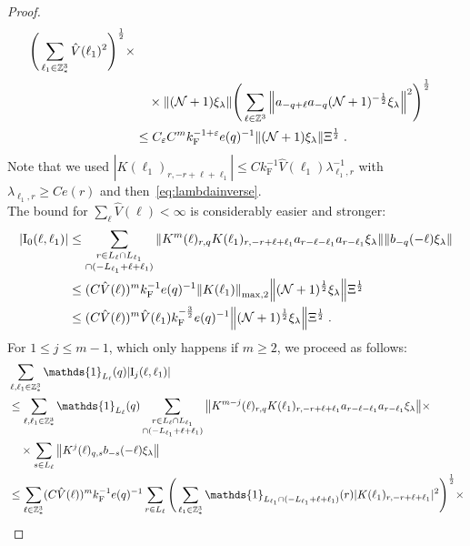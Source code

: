 \documentclass[12pt,a4paper]{article}
\numberwithin{equation}{section}
\newcommand{\1}{\mathbb{I}}
\newcommand{\F}{\mathrm{F}}
\newcommand{\I}{\mathrm{I}}
\newcommand{\Z}{\mathbb{Z}}
\newcommand{\NN}{\mathcal{N}}
\newcommand{\half}{\frac{1}{2}}
\theoremstyle{plain}
\theoremstyle{definition}
\theoremstyle{remark}
\theoremstyle{plain}
\theoremstyle{definition}
\theoremstyle{remark}
\begin{document}
\begin{proof}
\begin{align}
		\Bigg( \sum_{\ell_1 \in \Z^3_*} \hat{V}(\ell_1)^2 \Bigg)^{\half} \times \nonumber\\
	&\quad \times \norm{(\NN+1) \xi_\lambda}
		\Bigg( \sum_{\ell \in \Z^3} \norm{a_{-q+\ell} a_{-q} (\NN+1)^{-\half} \xi_\lambda}^2 \Bigg)^{\half} \nonumber\\
	&\leq C_\varepsilon C^m k_{\F}^{-1 + \varepsilon} e(q)^{-1}
		\norm{ (\NN+1) \xi_\lambda } \Xi^{\half} \;. \label{eq:estEQ2151_Coulomb}
\end{align}
Note that we used $ |K(\ell_1)_{r,-r+\ell+\ell_1}| \le C k_{\F}^{-1} \hat{V}(\ell_1) \lambda_{\ell_1,r}^{-1} $ with $ \lambda_{\ell_1,r} \ge C e(r) $ and then~\eqref{eq:lambdainverse}.\\
The bound for $ \sum_{\ell} \hat{V}(\ell) < \infty $ is considerably easier and stronger:
\begin{align}
	|\I_0(\ell, \ell_1)|
	&\leq \sum_{\substack{r\in L_{\ell} \cap L_{\ell_1} \\ \cap (-L_{\ell_1}+\ell+\ell_1)}} \norm{K^m(\ell)_{r,q} K(\ell_1)_{r,-r+\ell+\ell_1} a_{r-\ell-\ell_1} a_{r-\ell_1} \xi_\lambda}\norm{ b_{-q}(-\ell) \xi_\lambda}\nonumber\\
	&\leq (C \hat{V}(\ell))^m k_{\F}^{-1} e(q)^{-1}
		\norm{K(\ell_1)}_{\max,2} \norm{ (\NN+1)^\half \xi_\lambda } \Xi^{\half} \nonumber\\
	&\leq (C \hat{V}(\ell))^m
		\hat{V}(\ell_1)
		k_{\F}^{-\frac 32} e(q)^{-1}
		\norm{ (\NN+1)^\half \xi_\lambda } \Xi^{\half} \;. \label{eq:estEQ2151}
\end{align}
For $ 1 \le j \le m-1 $, which only happens if $ m \ge 2 $, we proceed as follows:
\begin{align}
	&\sum_{\ell,\ell_1 \in \Z^3_*} \mathds{1}_{L_\ell}(q) |\I_j(\ell, \ell_1)| \nonumber\\
	&\leq \sum_{\ell,\ell_1 \in \Z^3_*} \mathds{1}_{L_\ell}(q) \sum\limits_{\substack{r\in L_{\ell} \cap L_{\ell_1}\\ \cap (-L_{\ell_1}+\ell+\ell_1)}}
		\norm{ K^{m-j}(\ell)_{r,q} K(\ell_1)_{r,-r+\ell+\ell_1} a_{r-\ell-\ell_1} a_{r-\ell_1} \xi_\lambda} \times \nonumber\\
	&\quad \times \sum\limits_{s \in L_{\ell}}
		\norm{ K^j(\ell)_{q,s} b_{-s}(-\ell) \xi_\lambda }\nonumber\\
	&\leq \sum_{\ell \in \Z^3_*} (C \hat{V}(\ell))^m k_{\F}^{-1} e(q)^{-1}
		\sum_{r \in L_\ell}
		\Bigg( \sum_{\ell_1 \in \Z^3_*} \mathds{1}_{L_{\ell_1} \cap (-L_{\ell_1}+\ell+\ell_1) }(r) |K(\ell_1)_{r,-r+\ell+\ell_1}|^2 \Bigg)^{\half} \times \nonumber\\

\end{align}
\end{proof}
\end{document}
